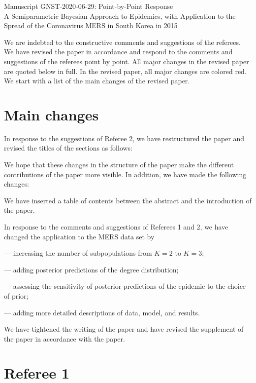 \documentclass[12pt]{article}
\renewcommand{\s}{\vspace{0.1cm}}
\renewcommand{\=}{&=&}
\renewcommand{\=}{&=&}
\begin{document}
\thispagestyle{empty}

\begin{center}
{\Large
Manuscript GNST-2020-06-29: Point-by-Point Response
}\s\s
\\
\large
A Semiparametric Bayesian Approach to Epidemics, with Application to the Spread of the Coronavirus MERS in South Korea in 2015
\end{center}

We are indebted to the constructive comments and suggestions of the referees.
We have revised the paper in accordance and respond to the comments and suggestions of the referees point by point.
All major changes in the revised paper are quoted below in full.
In the revised paper,
all major changes are colored red.
We start with a list of the main changes of the revised paper.

\section*{Main changes}

In response to the suggestions of Referee 2,
we have restructured the paper and revised the titles of the sections as follows:

We hope that these changes in the structure of the paper make the different contributions of the paper more visible.
In addition,
we have made the following changes:
\bi
\item We have inserted a table of contents between the abstract and the introduction of the paper.
\item In response to the comments and suggestions of Referees 1 and 2,
we have changed the application to the MERS data set by 
\bi
\item[---] increasing the number of subpopulations from $K=2$ to $K=3$;
\item[---] adding posterior predictions of the degree distribution;
\item[---] assessing the sensitivity of posterior predictions of the epidemic to the choice of prior;
\item[---] adding more detailed descriptions of data, model, and results.
\ei
\item We have tightened the writing of the paper and have revised the supplement of the paper in accordance with the paper.
\ei

\vspace{-.3cm}

\section*{Referee 1}
\end{document}
